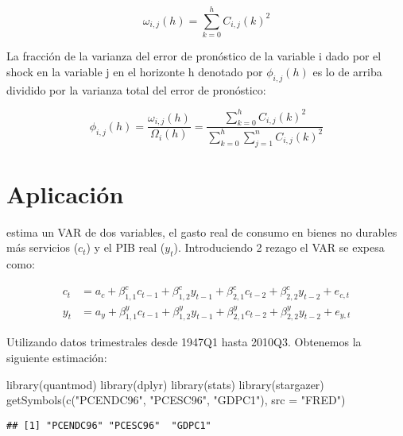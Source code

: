 \documentclass[
]{book}
\newenvironment{Shaded}{\begin{snugshade}}{\end{snugshade}}
\newcommand{\AttributeTok}[1]{\textcolor[rgb]{0.77,0.63,0.00}{#1}}
\newcommand{\FunctionTok}[1]{\textcolor[rgb]{0.00,0.00,0.00}{#1}}
\newcommand{\NormalTok}[1]{#1}
\newcommand{\StringTok}[1]{\textcolor[rgb]{0.31,0.60,0.02}{#1}}
\begin{document}
\begin{equation}
\omega_{i, j}(h)=\sum_{k=0}^{h} C_{i,j}(k)^{2}
\end{equation}

La fracción de la varianza del error de pronóstico de la variable i dado por el shock en la variable j en el horizonte h denotado por \(\phi_{i,j}(h)\) es lo de arriba dividido por la varianza total del error de pronóstico:

\begin{equation}
\phi_{i,j}(h)=\frac{\omega_{i, j}(h)}{\Omega_{i}(h)}=\frac{\sum_{k=0}^{h} C_{i,j}(k)^{2}}{\sum_{k=0}^{h} \sum_{j=1}^{n}C_{i,j}(k)^{2}}
\end{equation}

\hypertarget{aplicaciuxf3n-cochrane94}{%
\section{\texorpdfstring{Aplicación \citet{COCHRANE94}}{Aplicación @COCHRANE94}}\label{aplicaciuxf3n-cochrane94}}

\citet{COCHRANE94} estima un VAR de dos variables, el gasto real de consumo en bienes no durables más servicios (\(c_{t}\)) y el PIB real (\(y_{t}\)). Introduciendo 2 rezago el VAR se expesa como:

\begin{align}
c_{t}&= a_{c}+\beta_{1,1}^{c}c_{t-1}+\beta_{1,2}^{c}y_{t-1}+\beta_{2,1}^{c}c_{t-2}+\beta_{2,2}^{c}y_{t-2}+e_{c,t}\\
y_{t}&= a_{y}+\beta_{1,1}^{y}c_{t-1}+\beta_{1,2}^{y}y_{t-1}+\beta_{2,1}^{y}c_{t-2}+\beta_{2,2}^{y}y_{t-2}+e_{y,t}
\end{align}

Utilizando datos trimestrales desde 1947Q1 hasta 2010Q3. Obtenemos la siguiente estimación:

\begin{Shaded}
\begin{Highlighting}[]
\FunctionTok{library}\NormalTok{(quantmod)}
\FunctionTok{library}\NormalTok{(dplyr)}
\FunctionTok{library}\NormalTok{(stats)}
\FunctionTok{library}\NormalTok{(stargazer)}
\FunctionTok{getSymbols}\NormalTok{(}\FunctionTok{c}\NormalTok{(}\StringTok{"PCENDC96"}\NormalTok{, }\StringTok{"PCESC96"}\NormalTok{, }\StringTok{"GDPC1"}\NormalTok{),}
           \AttributeTok{src =} \StringTok{"FRED"}\NormalTok{)}
\end{Highlighting}
\end{Shaded}

\begin{verbatim}
## [1] "PCENDC96" "PCESC96"  "GDPC1"
\end{verbatim}
\end{document}
